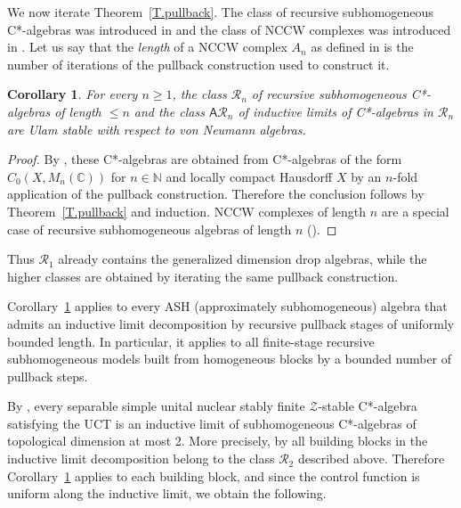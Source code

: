 \documentclass[11pt]{amsproc}
\newcommand{\bbN}{\mathbb N}
\newcommand{\cstar}{C*}
\newcommand{\sfAR}{\mathsf A\mathcal R}
\newcommand{\cR}{\mathcal R}
\newcommand{\bbC}{\mathbb C}
\theoremstyle{definition}
\theoremstyle{plain}
\newtheorem{corollary}[definition]{Corollary}
\theoremstyle{remark}
\begin{document}
We now iterate Theorem~\ref{T.pullback}. The class of recursive subhomogeneous \cstar-algebras was introduced in \cite{phillips2007recursive} and the class of NCCW complexes was introduced in \cite[\S 11]{pedersen1999pullback}. Let us say that the \emph{length} of a NCCW complex $A_n$ as defined in \cite[Definition~11.2]{pedersen1999pullback} is the number of iterations of the pullback construction used to construct it. 

\begin{corollary} \label{C.Recursive} For every $n\geq 1$, 
	the class $\mathcal R_n$ of recursive subhomogeneous \cstar-algebras of length $\leq n$ and the class $\sfAR_n$ of inductive limits of \cstar-algebras in $\cR_n$  are Ulam stable with respect to von Neumann algebras.  
\end{corollary}

\begin{proof}By \cite[Definition~1.2]{phillips2007recursive}, these \cstar-algebras are obtained from \cstar-algebras of the form $C_0(X,M_n(\bbC))$ for $n\in \bbN$ and locally compact Hausdorff $X$ by an $n$-fold application of the pullback construction. Therefore the conclusion follows by  Theorem~\ref{T.pullback} and induction. 
NCCW complexes of length $n$ are a special case of recursive subhomogeneous algebras of length $n$ (\cite[Example~1.5]{phillips2007recursive}). 
\end{proof}

Thus $\mathcal R_1$ already contains the generalized dimension drop algebras, while the higher classes are obtained by iterating the same pullback construction. 

Corollary~\ref{C.Recursive} applies to every ASH (approximately subhomogeneous) algebra that admits an inductive limit decomposition by recursive pullback stages of uniformly bounded length.  In particular, it applies to all finite-stage recursive subhomogeneous models built from homogeneous blocks by a bounded number of pullback steps.

By \cite[Theorem 6.2 (iii)]{tikuisis-white-winter}, every separable simple unital nuclear stably finite $\mathcal Z$-stable \cstar-algebra satisfying the UCT is an inductive limit of subhomogeneous \cstar-algebras of topological dimension at most 2.  More precisely, by \cite[1.9--1.11]{winter:decomposition-length} all building blocks in the inductive limit decomposition belong to the class $\mathcal R_2$ described above. Therefore Corollary~\ref{C.Recursive} applies to each building block, and since the control function is uniform along the inductive limit, we obtain the following. 
\end{document}
